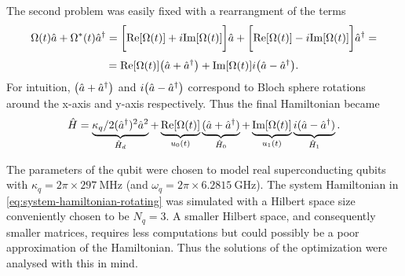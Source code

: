 \documentclass[main.tex]{subfiles}
\begin{document}
The second problem was easily fixed with a rearrangment of the terms
\[ \Omega(t)\hat{a} + \Omega^*(t)\hat{a}^\dagger = \bigg[\text{Re}\qty[\Omega(t)]+i\text{Im}\qty[\Omega(t)]\bigg]\hat{a} + \bigg[\text{Re}\qty[\Omega(t)]-i\text{Im}\qty[\Omega(t)]\bigg]\hat{a}^\dagger = \]
\[ = \text{Re}\qty[\Omega(t)]\qty(\hat{a} + \hat{a}^\dagger) + \text{Im}\qty[\Omega(t)]i\qty(\hat{a} - \hat{a}^\dagger). \]
For intuition, \( \qty(\hat{a} + \hat{a}^\dagger) \) and \( i\qty(\hat{a} - \hat{a}^\dagger) \) correspond to Bloch sphere rotations around the x-axis and y-axis respectively. 
Thus the final Hamiltonian became
\begin{equation}
    \hat{H} = \underbrace{\kappa_q/2(\hat{a}^\dagger)^2\hat{a}^2}_{\hat{H}_d} + \underbrace{\text{Re}\qty[\Omega(t)]}_{u_0(t)}\underbrace{(\hat{a} + \hat{a}^\dagger)}_{\hat{H}_0} + \underbrace{\text{Im}\qty[\Omega(t)]}_{u_1(t)}\underbrace{i(\hat{a} - \hat{a}^\dagger)}_{\hat{H}_1} .
    \label{eq:system-hamiltonian-rotating}
\end{equation}

The parameters of the qubit were chosen to model real superconducting qubits with \( \kappa_q = 2\pi\times\SI{297}{\mega\hertz} \) (and \( \omega_{q} = 2\pi\times\SI{6.2815}{\giga\hertz} \)).
The system Hamiltonian in \cref{eq:system-hamiltonian-rotating} was simulated with a Hilbert space size conveniently chosen to be \( N_q = 3 \).
A smaller Hilbert space, and consequently smaller matrices, requires less computations but could possibly be a poor approximation of the Hamiltonian.
Thus the solutions of the optimization were analysed with this in mind.
\end{document}
